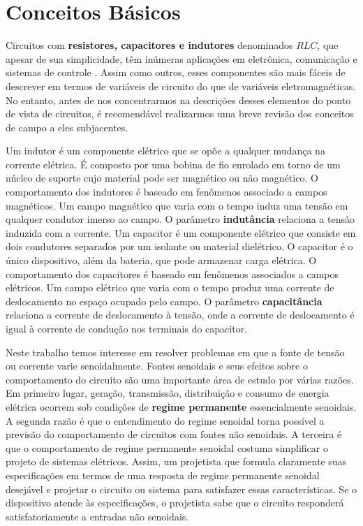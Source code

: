\documentclass[
	12pt,				%
	oneside,			%
	a4paper,			%
	english,			%
	french,				%
	spanish,			%
	brazil				%
	]{abntex2}
\begin{document}
\chapter{Conceitos Básicos}

Circuitos com \textbf{resistores, capacitores e indutores} denominados $RLC$, que apesar de sua simplicidade, têm inúmeras aplicações em eletrônica, comunicação e sistemas de controle \cite{sadiku}. Assim como outros, esses componentes são mais fáceis de descrever em termos de variáveis de circuito do que de variáveis eletromagnéticas. No entanto, antes de nos concentrarmos na descrições desses elementos do ponto de vista de circuitos, é recomendável realizarmos uma breve revisão dos conceitos de campo a eles subjacentes. 

Um indutor é um componente elétrico que se opõe a qualquer mudança na corrente elétrica. É composto por uma bobina de fio enrolado em torno de um núcleo de suporte cujo material pode ser magnético ou não magnético. O comportamento dos indutores é baseado em fenômenos associado a campos magnéticos. Um  campo magnético que varia com o tempo induz uma tensão em qualquer condutor imerso ao campo. O parâmetro \textbf{indutância} relaciona a tensão induzida com a corrente. Um capacitor é um componente elétrico que consiste em dois condutores separados por um isolante ou material dielétrico. O capacitor é o único dispositivo, além da bateria, que pode armazenar carga elétrica. O comportamento dos capacitores é baseado em fenômenos associados a campos elétricos. Um campo elétrico que varia com o tempo produz uma corrente de deslocamento no espaço ocupado pelo campo. O parâmetro \textbf{capacitância} relaciona a corrente de deslocamento à tensão, onde a corrente de deslocamento é igual à corrente de condução nos terminais do capacitor.

Neste trabalho temos interesse em resolver problemas em que a fonte de tensão ou corrente varie senoidalmente. Fontes senoidais e seus efeitos sobre o comportamento do circuito são uma importante área de estudo por várias razões. Em primeiro lugar, geração, transmissão, distribuição e consumo de energia elétrica ocorrem sob condições de \textbf{regime permanente} essencialmente senoidais. A segunda razão é que o entendimento do regime senoidal torna possível a previsão do comportamento de circuitos com fontes não senoidais. A terceira é que o comportamento de regime permanente senoidal costuma simplificar o projeto de sistemas elétricos. Assim, um projetista que formula claramente suas especificações em termos de uma resposta de regime permanente senoidal desejável e projetar o circuito ou sistema para satisfazer essas características. Se o dispositivo atende às especificações, o projetista sabe que o circuito responderá satisfatoriamente a entradas não senoidais.
\cite{nilssonriedel}
\end{document}
